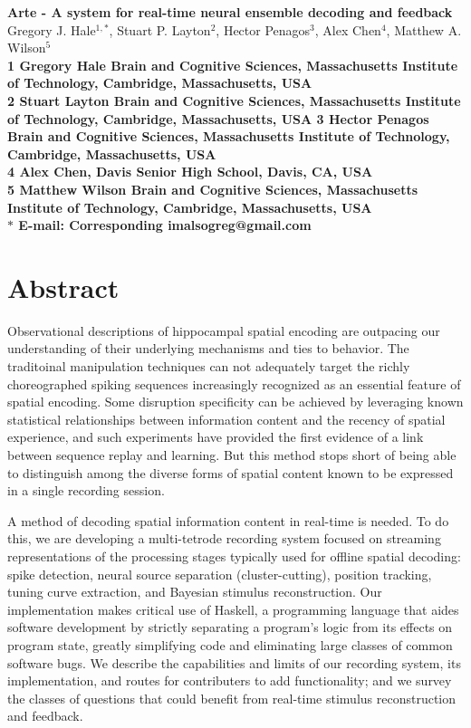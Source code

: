 \documentclass[10pt]{article}
\date{}
\begin{document}
\begin{flushleft}
{\Large
\textbf{Arte - A system for real-time neural ensemble decoding and feedback}
}
\\
Gregory J. Hale$^{1,\ast}$, 
Stuart P. Layton$^{2}$, 
Hector Penagos$^{3}$, 
Alex Chen$^{4}$,
Matthew A. Wilson$^{5}$
\\
\bf{1} Gregory Hale Brain and Cognitive Sciences, Massachusetts Institute of Technology, Cambridge, Massachusetts, USA
\\
\bf{2} Stuart Layton Brain and Cognitive Sciences, Massachusetts Institute of Technology, Cambridge, Massachusetts, USA
\bf{3} Hector Penagos Brain and Cognitive Sciences, Massachusetts Institute of Technology, Cambridge, Massachusetts, USA
\\
\bf{4} Alex Chen, Davis Senior High School, Davis, CA, USA
\\
\bf{5} Matthew Wilson Brain and Cognitive Sciences, Massachusetts Institute of Technology, Cambridge, Massachusetts, USA
\\
$\ast$ E-mail: Corresponding imalsogreg@gmail.com
\end{flushleft}

\section*{Abstract}
Observational descriptions of hippocampal spatial encoding are outpacing our understanding of their underlying mechanisms and ties to behavior. The traditoinal manipulation techniques can not adequately target the richly choreographed spiking sequences increasingly recognized as an essential feature of spatial encoding. Some disruption specificity can be achieved by leveraging known statistical relationships between information content and the recency of spatial experience, and such experiments have provided the first evidence of a link between sequence replay and learning.  But this method stops short of being able to distinguish among the diverse forms of spatial content known to be expressed in a single recording session.

A method of decoding spatial information content in real-time is needed. To do this, we are developing a multi-tetrode recording system focused on streaming representations of the processing stages typically used for offline spatial decoding: spike detection, neural source separation (cluster-cutting), position tracking, tuning curve extraction, and Bayesian stimulus reconstruction.  Our implementation makes critical use of Haskell, a programming language that aides software development by strictly separating a program's logic from its effects on program state, greatly simplifying code and eliminating large classes of common software bugs.  We describe the capabilities and limits of our recording system, its implementation, and routes for contributers to add functionality; and we survey the classes of questions that could benefit from real-time stimulus reconstruction and feedback.
\end{document}
